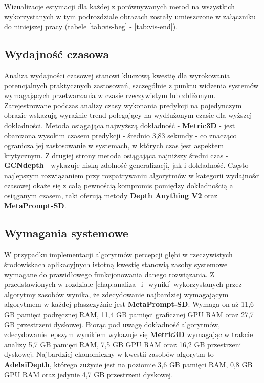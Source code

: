 Wizualizacje estymacji dla każdej z porównywanych metod na wszystkich wykorzystanych w tym podrozdziale obrazach zostały umieszczone w załączniku do niniejszej pracy (tabele \ref{tab:vis-beg} - \ref{tab:vis-end}).


\subsection{Wydajność czasowa}
Analiza wydajności czasowej stanowi kluczową kwestię dla wyrokowania potencjalnych praktycznych zastosowań, szczególnie z punktu widzenia systemów wymagających przetwarzania w czasie rzeczywistym lub zbliżonym. Zarejestrowane podczas analizy czasy wykonania predykcji na pojedynczym obrazie wskazują wyraźnie trend polegający na wydłużonym czasie dla wyższej dokładności. Metoda osiągająca najwyższą dokładność - \textbf{Metric3D} - jest obarczona wysokim czasem predykcji - średnio 3,83 sekundy - co znacząco ogranicza jej zastosowanie w systemach, w których czas jest aspektem krytycznym. Z drugiej strony metoda osiągająca najniższy średni czas - \textbf{GCNdepth} - wykazuje niską zdolność generalizacji, jak i dokładność. Często najlepszym rozwiązaniem przy rozpatrywaniu algorytmów w kategorii wydajności czasowej okaże się z całą pewnością kompromis pomiędzy dokładnością a osiąganym czasem, taki oferują metody \textbf{Depth Anything V2} oraz \textbf{MetaPrompt-SD}.

\subsection{Wymagania systemowe}
W przypadku implementacji algorytmów percepcji głębi w rzeczywistych środowiskach aplikacyjnych istotną kwestię stanowią zasoby systemowe wymagane do prawidłowego funkcjonowania danego rozwiązania. Z przedstawionych w rozdziale \ref{chap:analiza_i_wyniki} wykorzystanych przez algorytmy zasobów wynika, że zdecydowanie najbardziej wymagającym algorytmem w każdej płaszczyźnie jest \textbf{MetaPrompt-SD}. Wymaga on aż 11,6 GB pamięci podręcznej RAM, 11,4 GB pamięci graficznej GPU RAM oraz 27,7 GB przestrzeni dyskowej. Biorąc pod uwagę dokładność algorytmów, zdecydowanie lepszym wynikiem wykazuje się \textbf{Metric3D} wymagając w trakcie analizy 5,7 GB pamięci RAM, 7,5 GB GPU RAM oraz 16,2 GB przestrzeni dyskowej. Najbardziej ekonomiczny w kwestii zasobów algorytm to \textbf{AdelaiDepth}, którego zużycie jest na poziomie 3,6 GB pamięci RAM, 0,8 GB GPU RAM oraz jedynie 4,7 GB przestrzeni dyskowej.



